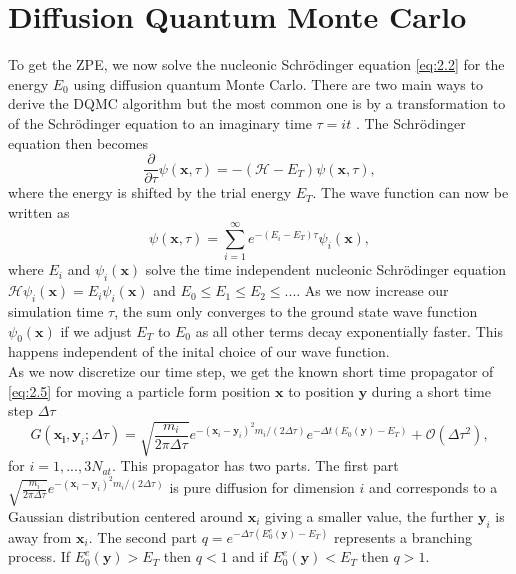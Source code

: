 \documentclass [12pt]{report}
\begin{document}
\section{Diffusion Quantum Monte Carlo}
To get the ZPE, we now solve the nucleonic Schrödinger equation \eqref{eq:2.2} for the energy $E_0$ using diffusion quantum Monte Carlo. There are two main ways to derive the DQMC algorithm but the most common one is by a transformation to of the Schrödinger equation to an imaginary time $\tau = it$ \cite{mccoy,cyrus,herleitung2}. The Schrödinger equation then becomes
\begin{equation} \label{eq:2.5}
\frac{\partial}{\partial \tau} \psi(\bm{x},\tau) = -(\mathcal{H} - E_T) \psi(\bm{x},\tau),
\end{equation}
where the energy is shifted by the trial energy $E_T$. The wave function can now be written as
\begin{equation} \label{eq:2.6}
\psi(\bm{x},\tau) = \sum_{i=1}^{\infty} e^{-(E_i - E_T)\tau}\psi_i(\bm{x}),
\end{equation}
where $E_i$ and $\psi_i(\bm{x})$ solve the time independent nucleonic Schrödinger equation $\mathcal{H}\psi_i(\bm{x}) = E_i \psi_i(\bm{x})$ and $E_0 \leq E_1 \leq E_2 \leq...$.
As we now increase our simulation time $\tau$, the sum only converges to the ground state wave function $\psi_0(\bm{x})$ if we adjust $E_T$ to $E_0$ as all other terms decay exponentially faster. This happens independent of the inital choice of our wave function. \\
As we now discretize our time step, we get the known short time propagator of \eqref{eq:2.5} for moving a particle form position $\bm{x}$ to position $\bm{y}$ during a short time step $\Delta \tau$
\begin{equation} \label{eq:2.7}
G(\bm{x_i},\bm{y}_i;\Delta \tau) = \sqrt{\frac{m_i}{2 \pi \Delta \tau}} e^{-(\bm{x}_i-\bm{y}_i)^2 m_i/(2 \Delta \tau)} e^{-\Delta t (E_0(\bm{y}) - E_T)} + \mathcal{O}(\Delta \tau^2),
\end{equation}
for $i=1,...,3N_{at}$. This propagator has two parts. The first part $\sqrt{\frac{m_i}{2 \pi \Delta \tau}} e^{-(\bm{x}_i-\bm{y}_i)^2 m_i/(2\Delta \tau)}$ is pure diffusion for dimension $i$ and corresponds to a Gaussian distribution centered around $\bm{x}_i$ giving a smaller value, the further $\bm{y}_i$ is away from $\bm{x}_i$. The second part $q = e^{-\Delta \tau (E_0^e(\bm{y}) - E_T)}$ represents a branching process. If $E_0^e(\bm{y}) > E_T$ then $q < 1$ and if $E_0^e(\bm{y}) < E_T$ then $q > 1$.\\
\end{document}
